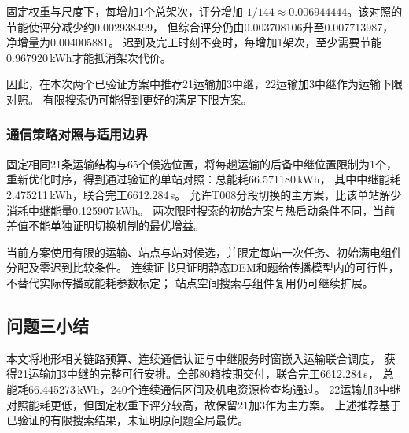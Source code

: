 固定权重与尺度下，每增加1个总架次，评分增加
$1/144\approx0.006944444$。该对照的节能使评分减少约0.002938499，
但综合评分仍由0.003708106升至0.007713987，净增量为0.004005881。
迟到及完工时刻不变时，每增加1架次，至少需要节能0.967920\,kWh才能抵消架次代价。

因此，在本次两个已验证方案中推荐21运输加3中继，22运输加3中继作为运输下限对照。
有限搜索仍可能得到更好的满足下限方案。

\subsubsection{通信策略对照与适用边界}
固定相同21条运输结构与65个候选位置，将每趟运输的后备中继位置限制为1个，
重新优化时序，得到通过验证的单站对照：总能耗66.571180\,kWh，
其中中继能耗2.475211\,kWh，联合完工6612.284\,s。
允许T008分段切换的主方案，比该单站解少消耗中继能量0.125907\,kWh。
两次限时搜索的初始方案与热启动条件不同，当前差值不能单独证明切换机制的最优增益。

当前方案使用有限的运输、站点与站对候选，并限定每站一次任务、初始满电组件分配及零迟到比较条件。
连续证书只证明静态DEM和题给传播模型内的可行性，不替代实际传播或能耗参数标定；
站点空间搜索与组件复用仍可继续扩展。

\subsection{问题三小结}
本文将地形相关链路预算、连续通信认证与中继服务时窗嵌入运输联合调度，
获得21运输加3中继的完整可行安排。全部80箱按期交付，联合完工6612.284\,s，
总能耗66.445273\,kWh，240个连续通信区间及机电资源检查均通过。
22运输加3中继对照能耗更低，但固定权重下评分较高，故保留21加3作为主方案。
上述推荐基于已验证的有限搜索结果，未证明原问题全局最优。
\par\endgroup
